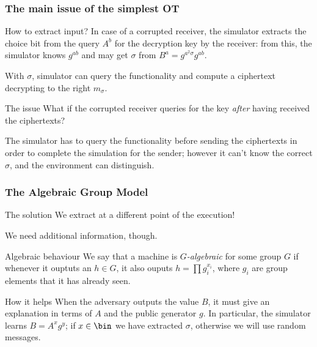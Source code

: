 \documentclass{beamer}
\begin{document}
    \begin{frame}
        \frametitle{The main issue of the simplest OT}
        
        \begin{block}{How to extract input?}
            In case of a corrupted receiver, the simulator extracts the choice bit from the query $A^b$ for the decryption key by the receiver: from this, the simulator knows $g^{ab}$ and may get $\sigma$ from $B^a=g^{a^2\sigma}g^{ab}$.
            
            With $\sigma$, simulator can query the functionality and compute a ciphertext decrypting to the right $m_\sigma$.
        \end{block}
    
        \begin{alertblock}{The issue}
            What if the corrupted receiver queries for the key \emph{after} having received the ciphertexts?
            
            The simulator has to query the functionality before sending the ciphertexts in order to complete the simulation for the sender; however it can't know the correct $\sigma$, and the environment can distinguish.
        \end{alertblock}
    \end{frame}
   
    \begin{frame}
        \frametitle{The Algebraic Group Model}
        
        \begin{exampleblock}{The solution}
            We extract at a different point of the execution!
            
            We need additional information, though.
        \end{exampleblock}
    
        \begin{block}{Algebraic behaviour}
            We say that a machine is \emph{$G$-algebraic} for some group $G$ if whenever it ouptuts an $h\in G$, it also ouputs $h=\prod g_i^{x_i}$, where $g_i$ are group elements that it has already seen.
        \end{block}
    
        \begin{block}{How it helps}
            When the adversary outputs the value $B$, it must give an explanation in terms of $A$ and the public generator $g$. In particular, the simulator learns $B=A^xg^y$; if $x\in\bin$ we have extracted $\sigma$, otherwise we will use random messages.
        \end{block}
    \end{frame}
\end{document}
